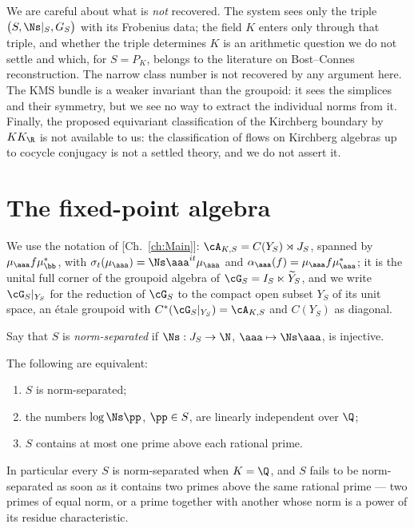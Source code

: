 \begin{summary}
We are careful about what is \emph{not} recovered. The system sees only the triple
$\bigl(S,\Ns|_S,G_S\bigr)$ with its Frobenius data; the field $K$ enters only through that
triple, and whether the triple determines $K$ is an arithmetic question we do not settle and
which, for $S=P_K$, belongs to the literature on Bost--Connes reconstruction. The narrow class
number is not recovered by any argument here. The KMS bundle is a weaker invariant than the
groupoid: it sees the simplices and their symmetry, but we see no way to extract the
individual norms from it. Finally, the proposed equivariant classification of the Kirchberg
boundary by $KK_\R$ is not available to us: the classification of flows on Kirchberg algebras
up to cocycle conjugacy is not a settled theory, and we do not assert it.
\end{summary}


\section{The fixed-point algebra}

We use the notation of [Ch.~\ref{ch:Main}]: $\cA_{K,S}=C(Y_S)\rtimes J_S$, spanned by $\mu_\aaa f\mu_\bb^*$,
with $\sigma_t(\mu_\aaa)=\Ns\aaa^{it}\mu_\aaa$ and $\alpha_\aaa(f)=\mu_\aaa f\mu_\aaa^*$; it is
the unital full corner of the groupoid algebra of $\cG_S=I_S\ltimes\widetilde Y_S$, and we
write $\cG_S|_{Y_S}$ for the reduction of $\cG_S$ to the compact open subset $Y_S$ of its
unit space, an \'etale groupoid with $C^*(\cG_S|_{Y_S})=\cA_{K,S}$ and $C(Y_S)$ as diagonal.

\begin{definition}\label{XIII:def:injective}
Say that $S$ is \emph{norm-separated} if $\Ns:J_S\to\N$, $\aaa\mapsto\Ns\aaa$, is injective.
\end{definition}

\begin{lemma}\label{XIII:lem:sep}
The following are equivalent:
\begin{enumerate}
\item $S$ is norm-separated;
\item the numbers $\log\Ns\pp$, $\pp\in S$, are linearly independent over $\Q$;
\item $S$ contains at most one prime above each rational prime.
\end{enumerate}
In particular every $S$ is norm-separated when $K=\Q$, and $S$ fails to be norm-separated
as soon as it contains two primes above the same rational prime --- two primes of equal
norm, or a prime together with another whose norm is a power of its residue
characteristic.
\end{lemma}

